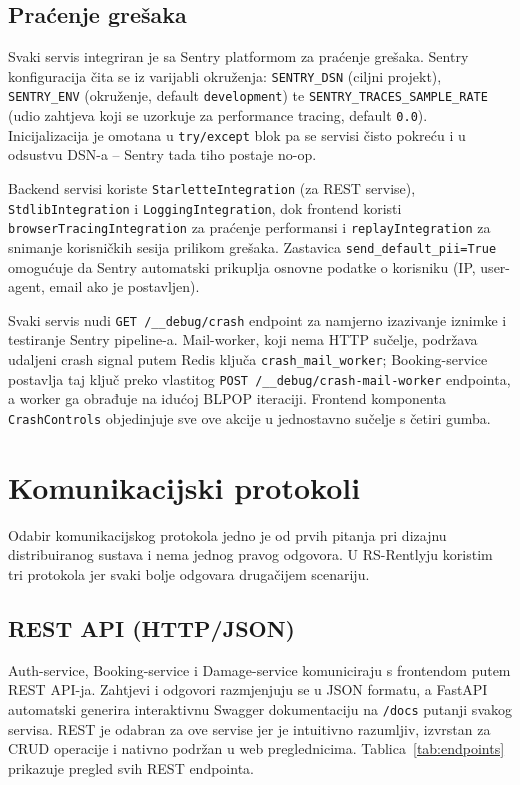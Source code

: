 \documentclass[12pt,a4paper]{article}
\begin{document}
\subsection{Praćenje grešaka}

Svaki servis integriran je sa Sentry platformom za praćenje grešaka. Sentry konfiguracija čita se iz varijabli okruženja: \texttt{SENTRY\_DSN} (ciljni projekt), \texttt{SENTRY\_ENV} (okruženje, default \texttt{development}) te \texttt{SENTRY\_TRACES\_SAMPLE\_RATE} (udio zahtjeva koji se uzorkuje za performance tracing, default \texttt{0.0}). Inicijalizacija je omotana u \texttt{try/except} blok pa se servisi čisto pokreću i u odsustvu DSN-a -- Sentry tada tiho postaje no-op.

Backend servisi koriste \texttt{StarletteIntegration} (za REST servise), \texttt{StdlibIntegration} i \texttt{LoggingIntegration}, dok frontend koristi \texttt{browserTracingIntegration} za praćenje performansi i \texttt{replayIntegration} za snimanje korisničkih sesija prilikom grešaka. Zastavica \texttt{send\_default\_pii=True} omogućuje da Sentry automatski prikuplja osnovne podatke o korisniku (IP, user-agent, email ako je postavljen).

Svaki servis nudi \texttt{GET /\_\_debug/crash} endpoint za namjerno izazivanje iznimke i testiranje Sentry pipeline-a. Mail-worker, koji nema HTTP sučelje, podržava udaljeni crash signal putem Redis ključa \texttt{crash\_mail\_worker}; Booking-service postavlja taj ključ preko vlastitog \texttt{POST /\_\_debug/crash-mail-worker} endpointa, a worker ga obrađuje na idućoj BLPOP iteraciji. Frontend komponenta \texttt{CrashControls} objedinjuje sve ove akcije u jednostavno sučelje s četiri gumba.

\section{Komunikacijski protokoli}

Odabir komunikacijskog protokola jedno je od prvih pitanja pri dizajnu distribuiranog sustava i nema jednog pravog odgovora. U RS-Rentlyju koristim tri protokola jer svaki bolje odgovara drugačijem scenariju.

\subsection{REST API (HTTP/JSON)}

Auth-service, Booking-service i Damage-service komuniciraju s frontendom putem REST API-ja. Zahtjevi i odgovori razmjenjuju se u JSON formatu, a FastAPI automatski generira interaktivnu Swagger dokumentaciju na \texttt{/docs} putanji svakog servisa. REST je odabran za ove servise jer je intuitivno razumljiv, izvrstan za CRUD operacije i nativno podržan u web preglednicima. Tablica~\ref{tab:endpoints} prikazuje pregled svih REST endpointa.
\end{document}
